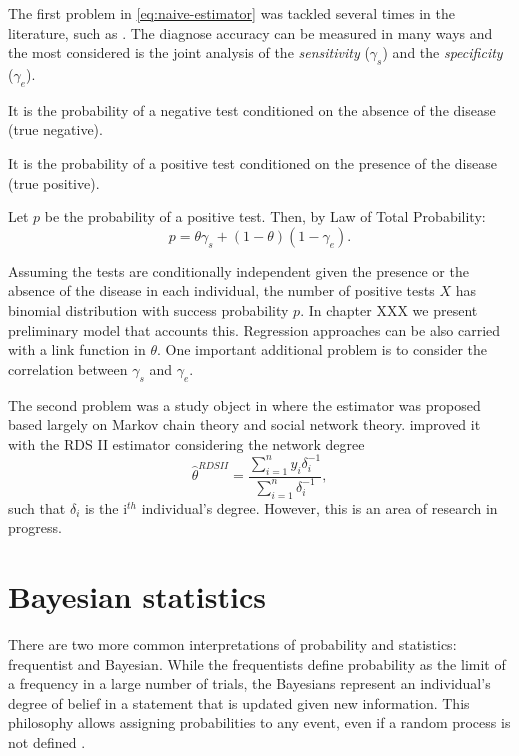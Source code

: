 The first problem in \eqref{eq:naive-estimator} was tackled several times in
the literature, such as \cite{mcinturff2004modelling}. The diagnose accuracy
can be measured in many ways and the most considered is the joint analysis of
the {\em sensitivity} ($\gamma_s$) and the {\em specificity}
($\gamma_e$). 

\begin{definition}[Specificity]
    It is the probability of a negative test conditioned on the absence of the
    disease (true negative).
\end{definition}

\begin{definition}[Sensitivity]
    It is the probability of a positive test conditioned on the presence of
    the disease (true positive). 
\end{definition}

Let $p$ be the probability of a positive test. Then, by Law of Total
Probability: 
\begin{equation}
    p = \theta\gamma_s + (1-\theta)(1-\gamma_e).    
\end{equation}

Assuming the tests are conditionally independent given the presence or the
absence of the disease in each individual, the number of positive tests $X$
has binomial distribution with success probability $p$. In chapter
XXX we present preliminary model that
accounts this.  Regression approaches can be also carried with a link function
in $\theta$. One important additional problem is to consider the
correlation between $\gamma_s$ and $\gamma_e$. 


The second problem was a study object in \cite{heckathorn1997,heckathorn2002} where the estimator was proposed
based largely on Markov chain theory and social network theory.
\cite{volz2008probability} improved it with the RDS II estimator considering
the network degree
\begin{equation}
    \hat{\theta}^{RDS II} = \frac{\sum_{i=1}^n y_i \delta_i^{-1}}{\sum_{i=1}^n \delta_i^{-1}},
\end{equation}
such that $\delta_i$ is the i$^{th}$ individual's degree. However, this is an
area of research in progress. 

\section{Bayesian statistics}

There are two more common interpretations of probability and statistics:
frequentist and Bayesian. While the frequentists define
probability as the limit of a frequency in a large number of trials, the
Bayesians represent an individual's degree of belief in a statement that is
updated given new information. This philosophy allows assigning probabilities
to any event, even if a random process is not defined \cite{statisticat2016laplacesdemon}. 

